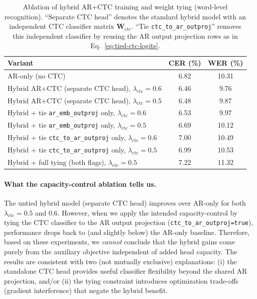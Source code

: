 \begin{table}[t]
\centering
\begin{tabular}{lcc}
\hline
\textbf{Variant} & \textbf{CER (\%)} & \textbf{WER (\%)} \\
\hline
AR-only (no CTC) & 6.82 & 10.31 \\
\hline
Hybrid AR+CTC (separate CTC head), $\lambda_{\text{ctc}}=0.6$ & 6.46 & 9.76 \\
Hybrid AR+CTC (separate CTC head), $\lambda_{\text{ctc}}=0.5$ & 6.48 & 9.87 \\
\hline
Hybrid + tie \texttt{ar\_emb\_outproj} only, $\lambda_{\text{ctc}}=0.6$ & 6.53 & 9.97 \\
Hybrid + tie \texttt{ar\_emb\_outproj} only, $\lambda_{\text{ctc}}=0.5$ & 6.69 & 10.12 \\
\hline
Hybrid + tie \texttt{ctc\_to\_ar\_outproj} only, $\lambda_{\text{ctc}}=0.6$ & 7.00 & 10.49 \\
Hybrid + tie \texttt{ctc\_to\_ar\_outproj} only, $\lambda_{\text{ctc}}=0.5$ & 6.99 & 10.53 \\
\hline
Hybrid + full tying (both flags), $\lambda_{\text{ctc}}=0.5$ & 7.22 & 11.32 \\
\hline
\end{tabular}
\caption{Ablation of hybrid AR+CTC training and weight tying (word-level recognition). ``Separate CTC head'' denotes the standard hybrid model with an independent CTC classifier matrix $\mathbf{W}_{\text{ctc}}$. ``Tie \texttt{ctc\_to\_ar\_outproj}'' removes this independent classifier by reusing the AR output projection rows as in Eq.~\eqref{eq:tied-ctc-logits}.}
\label{tab:hybrid-ctc-tying-results}
\end{table}

\paragraph{What the capacity-control ablation tells us.}
The untied hybrid model (separate CTC head) improves over AR-only for both $\lambda_{\text{ctc}}=0.5$ and $0.6$.
However, when we apply the intended capacity-control by tying the CTC classifier to the AR output projection (\texttt{ctc\_to\_ar\_outproj=true}), performance drops back to (and slightly below) the AR-only baseline.
Therefore, based on these experiments, we \emph{cannot} conclude that the hybrid gains come purely from the auxiliary objective independent of added head capacity.
The results are consistent with two (not mutually exclusive) explanations: (i) the standalone CTC head provides useful classifier flexibility beyond the shared AR projection, and/or (ii) the tying constraint introduces optimization trade-offs (gradient interference) that negate the hybrid benefit.

